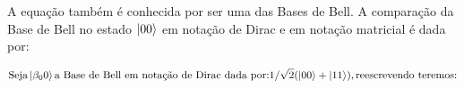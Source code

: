 \documentclass[11pt,oneside,brazil,hidelinks,article,sumario=tradicional,a4paper]{abntex2}
\begin{document}
A equação também é conhecida por ser uma das Bases de Bell. A comparação da Base de Bell no estado $\ket{00}$ em notação de Dirac e em notação matricial é dada por:

\begin{equation}
\text{Seja} \ket{\beta_00} \text{a Base de Bell em notação de Dirac dada por:} 1/\sqrt{2} (\ket{00} + \ket{11}), \text{reescrevendo teremos:}
\end{equation}
%




\clearpage
\printbibliography[heading=subbibliography]
\end{document}
